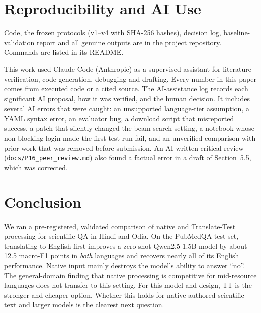 \documentclass[acmsmall,nonacm]{acmart}
\begin{document}
\section{Reproducibility and AI Use}
Code, the frozen protocols (v1--v4 with SHA-256 hashes), decision log, baseline-validation report and all genuine outputs are in the project repository. Commands are listed in its README.

This work used Claude Code (Anthropic) as a supervised assistant for literature verification, code generation, debugging and drafting. Every number in this paper comes from executed code or a cited source. The AI-assistance log records each significant AI proposal, how it was verified, and the human decision. It includes several AI errors that were caught: an unsupported language-tier assumption, a YAML syntax error, an evaluator bug, a download script that misreported success, a patch that silently changed the beam-search setting, a notebook whose non-blocking login made the first test run fail, and an unverified comparison with prior work that was removed before submission. An AI-written critical review (\texttt{docs/P16\_peer\_review.md}) also found a factual error in a draft of Section~5.5, which was corrected.

\section{Conclusion}
We ran a pre-registered, validated comparison of native and Translate-Test processing for scientific QA in Hindi and Odia. On the PubMedQA test set, translating to English first improves a zero-shot Qwen2.5-1.5B model by about 12.5 macro-F1 points in \emph{both} languages and recovers nearly all of its English performance. Native input mainly destroys the model's ability to answer ``no''. The general-domain finding that native processing is competitive for mid-resource languages does not transfer to this setting. For this model and design, TT is the stronger and cheaper option. Whether this holds for native-authored scientific text and larger models is the clearest next question.



\end{document}
